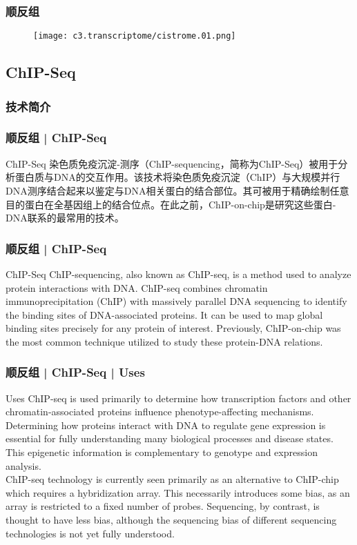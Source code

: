 \begin{frame}
  \frametitle{顺反组}
  \begin{figure}
    \centering
    \texttt{[image: c3.transcriptome/cistrome.01.png]}
  \end{figure}
\end{frame}

\subsection{ChIP-Seq}
\subsubsection{技术简介}
\begin{frame}
  \frametitle{顺反组 | ChIP-Seq}
  \begin{block}{ChIP-Seq}
染色质免疫沉淀-测序（ChIP-sequencing，简称为ChIP-Seq）被用于分析蛋白质与DNA的交互作用。该技术将染色质免疫沉淀（ChIP）与大规模并行DNA测序结合起来以鉴定与DNA相关蛋白的结合部位。其可被用于精确绘制任意目的蛋白在全基因组上的结合位点。在此之前，ChIP-on-chip是研究这些蛋白-DNA联系的最常用的技术。
  \end{block}
\end{frame}

\begin{frame}
  \frametitle{顺反组 | ChIP-Seq}
  \begin{block}{ChIP-Seq}
    ChIP-sequencing, also known as ChIP-seq, is a method used to analyze protein interactions with DNA. ChIP-seq combines chromatin immunoprecipitation (ChIP) with massively parallel DNA sequencing to identify the binding sites of DNA-associated proteins. It can be used to map global binding sites precisely for any protein of interest. Previously, ChIP-on-chip was the most common technique utilized to study these protein-DNA relations.
  \end{block}
\end{frame}

\begin{frame}
  \frametitle{顺反组 | ChIP-Seq | Uses}
  \begin{block}{Uses}
    ChIP-seq is used primarily to determine how transcription factors and other chromatin-associated proteins influence phenotype-affecting mechanisms. Determining how proteins interact with DNA to regulate gene expression is essential for fully understanding many biological processes and disease states. This epigenetic information is complementary to genotype and expression analysis.\\
    \vspace{1em}
    ChIP-seq technology is currently seen primarily as an alternative to ChIP-chip which requires a hybridization array. This necessarily introduces some bias, as an array is restricted to a fixed number of probes. Sequencing, by contrast, is thought to have less bias, although the sequencing bias of different sequencing technologies is not yet fully understood.\\
  \end{block}
\end{frame}


